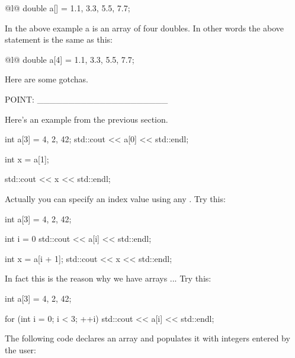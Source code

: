 \begin{consolethree}[escapeinside=||][]{@l@}
double a[] = {1.1, 3.3, 5.5, 7.7};  
\end{consolethree}

In the above example a is an array of four doubles. In other words the
above statement is the same as this:

\begin{consolethree}[escapeinside=||][]{@l@}
double a[4] = {1.1, 3.3, 5.5, 7.7};  
\end{consolethree}

\newpage{}

Here are some gotchas.




POINT: \_\_\_\_\_\_\_\_\_\_\_\_\_\_\_\_\_\_\_\_\_


\newpage{}

Here's an example from the previous section.

\begin{consolethree}[escapeinside=||]
int a[3] = {4, 2, 42};
std::cout << a[0] << std::endl;

int x = a[1];

std::cout << x << std::endl;  
\end{consolethree}

Actually you can specify an index value using any . Try this:

\begin{consolethree}[escapeinside=||]
int a[3] = {4, 2, 42};

int i = 0
std::cout << a[i] << std::endl;

int x = a[i + 1];
std::cout << x << std::endl;  
\end{consolethree}

In fact this is the reason why we have arrays ... Try this:

\begin{consolethree}[escapeinside=||]
int a[3] = {4, 2, 42};

for (int i = 0; i < 3; ++i)
{
    std::cout << a[i] << std::endl;
}
\end{consolethree}

The following code declares an array and populates it with integers entered by the user:

